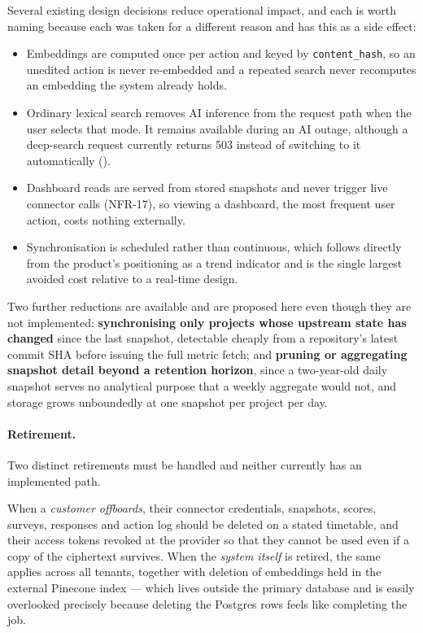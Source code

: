 Several existing design decisions reduce operational impact, and each is worth
naming because each was taken for a different reason and has this as a side
effect:

\begin{itemize}
  \item Embeddings are computed once per action and keyed by
  \texttt{content\_hash}, so an unedited action is never re-embedded and a
  repeated search never recomputes an embedding the system already holds.
  \item Ordinary lexical search removes AI inference from the request path when
  the user selects that mode. It remains available during an AI outage, although
  a deep-search request currently returns 503 instead of switching to it
  automatically ().
  \item Dashboard reads are served from stored snapshots and never trigger live
  connector calls (NFR-17), so viewing a dashboard, the most frequent user
  action, costs nothing externally.
  \item Synchronisation is scheduled rather than continuous, which follows
  directly from the product's positioning as a trend indicator and is the single
  largest avoided cost relative to a real-time design.
\end{itemize}

Two further reductions are available and are proposed here even though they are
not implemented: \textbf{synchronising only projects whose upstream state has
changed} since the last snapshot, detectable cheaply from a repository's latest
commit SHA before issuing the full metric fetch; and \textbf{pruning or
aggregating snapshot detail beyond a retention horizon}, since a two-year-old
daily snapshot serves no analytical purpose that a weekly aggregate would not,
and storage grows unboundedly at one snapshot per project per day.

\paragraph{Retirement.} Two distinct retirements must be handled and neither
currently has an implemented path.

When a \emph{customer offboards}, their connector credentials, snapshots,
scores, surveys, responses and action log should be deleted on a stated
timetable, and their access tokens revoked at the provider so that they cannot
be used even if a copy of the ciphertext survives. When the \emph{system itself}
is retired, the same applies across all tenants, together with deletion of
embeddings held in the external Pinecone index --- which lives outside the
primary database and is easily overlooked precisely because deleting the
Postgres rows feels like completing the job.

